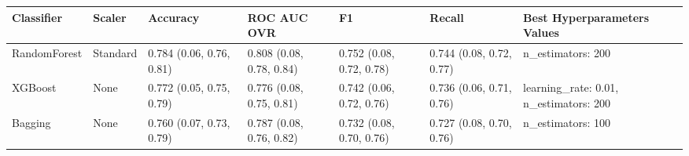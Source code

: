 \begin{tabular}{lllllll}
\toprule
Classifier & Scaler & Accuracy & ROC AUC OVR & F1 & Recall & Best Hyperparameters Values \\
\midrule
RandomForest & Standard & 0.784 (0.06, 0.76, 0.81) & 0.808 (0.08, 0.78, 0.84) & 0.752 (0.08, 0.72, 0.78) & 0.744 (0.08, 0.72, 0.77) & {{n\_estimators: 200}} \\
XGBoost & None & 0.772 (0.05, 0.75, 0.79) & 0.776 (0.08, 0.75, 0.81) & 0.742 (0.06, 0.72, 0.76) & 0.736 (0.06, 0.71, 0.76) & {{learning\_rate: 0.01, n\_estimators: 200}} \\
Bagging & None & 0.760 (0.07, 0.73, 0.79) & 0.787 (0.08, 0.76, 0.82) & 0.732 (0.08, 0.70, 0.76) & 0.727 (0.08, 0.70, 0.76) & {{n\_estimators: 100}} \\
\bottomrule
\end{tabular}
